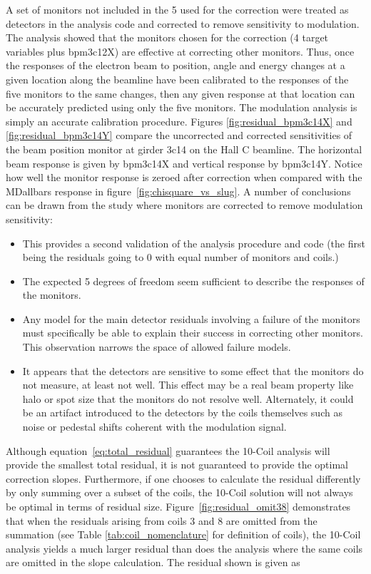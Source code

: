 A set of monitors not included in the 5 used for the correction were treated as detectors in the analysis code and corrected to remove sensitivity to modulation. The analysis showed that the monitors chosen for the correction (4 target variables plus bpm3c12X) are effective at correcting other monitors. Thus, once the responses of the electron beam to position, angle and energy changes at a given location along the beamline have been calibrated to the responses of the five monitors to the same changes, then any given response at that location can be accurately predicted using only the five monitors. The modulation analysis is simply an accurate calibration procedure. Figures \ref{fig:residual_bpm3c14X} and \ref{fig:residual_bpm3c14Y} compare the uncorrected and corrected sensitivities of the beam position monitor at girder 3c14 on the Hall C beamline. The horizontal beam response is given by bpm3c14X and vertical response by bpm3c14Y. Notice how well the monitor response is zeroed after correction when compared with the MDallbars response in figure~\ref{fig:chisquare_vs_slug}. 
\FloatBarrier
A number of conclusions can be drawn from the study where monitors are corrected to remove modulation sensitivity:
\begin{itemize}
\item{This provides a second validation of the analysis procedure and code (the first being the residuals going to 0 with equal number of monitors and coils.)}
\item{The expected 5 degrees of freedom seem sufficient to describe the responses of the monitors.}
\item{Any model for the main detector residuals involving a failure of the monitors must specifically be able to explain their success in correcting other monitors. This observation narrows the space of allowed failure models.}
\item{It appears that the detectors are sensitive to some effect that the monitors do not measure, at least not well. This effect may be a real beam property like halo or spot size that the monitors do not resolve well. Alternately, it could be an artifact introduced to the detectors by the coils themselves such as noise or pedestal shifts coherent with the modulation signal.}
\end{itemize} 
Although equation~\ref{eq:total_residual} guarantees the 10-Coil analysis will provide the smallest total residual, it is not guaranteed to provide the optimal correction slopes. Furthermore, if one chooses to calculate the residual differently by only summing over a subset of the coils, the 10-Coil solution will not always be optimal in terms of residual size. Figure~\ref{fig:residual_omit38} demonstrates that when the residuals arising from coils 3 and 8 are omitted from the summation (see Table \ref{tab:coil_nomenclature} for definition of coils), the 10-Coil analysis yields a much larger residual than does the analysis where the same coils are omitted in the slope calculation. The residual shown is given as
